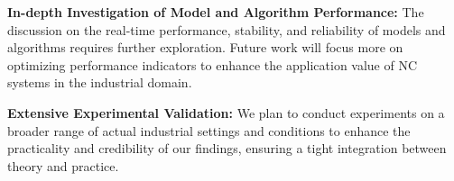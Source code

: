 \documentclass[preprint,12pt]{elsarticle}
\begin{document}
\textbf{In-depth Investigation of Model and Algorithm Performance:} The discussion on the real-time performance, stability, and reliability of models and algorithms requires further exploration. Future work will focus more on optimizing performance indicators to enhance the application value of NC systems in the industrial domain.

\textbf{Extensive Experimental Validation:} We plan to conduct experiments on a broader range of actual industrial settings and conditions to enhance the practicality and credibility of our findings, ensuring a tight integration between theory and practice.




 






\end{document}
